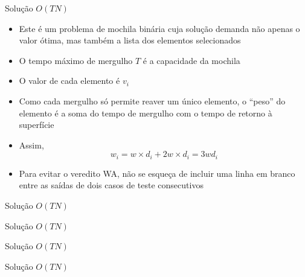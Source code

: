 \begin{frame}[fragile]{Solução $O(TN)$}

   \begin{itemize}
        \item Este é um problema de mochila binária cuja solução demanda não apenas o valor
            ótima, mas também a lista dos elementos selecionados

        \item O tempo máximo de mergulho $T$ é a capacidade da mochila

        \item O valor de cada elemento é $v_i$

        \item Como cada mergulho só permite reaver um único elemento, o ``peso'' do elemento
            é a soma do tempo de mergulho com o tempo de retorno à superfície

        \item Assim,
        \[
            w_i = w\times d_i + 2w\times d_i = 3wd_i
        \]

        \item Para evitar o veredito WA, não se esqueça de incluir uma linha em branco entre
            as saídas de dois casos de teste consecutivos
   \end{itemize}

\end{frame}

\begin{frame}[fragile]{Solução $O(TN)$}
\end{frame}

\begin{frame}[fragile]{Solução $O(TN)$}
\end{frame}

\begin{frame}[fragile]{Solução $O(TN)$}
\end{frame}

\begin{frame}[fragile]{Solução $O(TN)$}
\end{frame}


